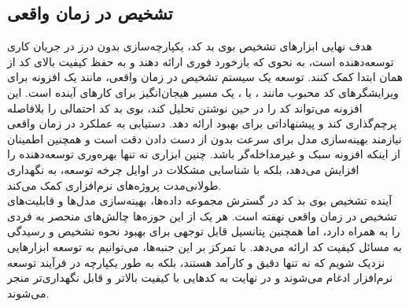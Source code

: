 \subsection{تشخیص در زمان واقعی}

هدف نهایی ابزارهای تشخیص بوی بد کد، یکپارچه‌سازی بدون درز در جریان کاری توسعه‌دهنده است، به نحوی که بازخورد فوری ارائه دهند و به حفظ کیفیت بالای کد از همان ابتدا کمک کنند. توسعه یک سیستم تشخیص در زمان واقعی، مانند یک افزونه برای ویرایشگرهای کد محبوب مانند ،  یا ، یک مسیر هیجان‌انگیز برای کارهای آینده است. این افزونه می‌تواند کد را در حین نوشتن تحلیل کند، بوی بد کد احتمالی را بلافاصله پرچم‌گذاری کند و پیشنهاداتی برای بهبود ارائه دهد. دستیابی به عملکرد در زمان واقعی نیازمند بهینه‌سازی مدل برای سرعت بدون از دست دادن دقت است و همچنین اطمینان از اینکه افزونه سبک و غیرمداخله‌گر باشد. چنین ابزاری نه تنها بهره‌وری توسعه‌دهنده را افزایش می‌دهد، بلکه با شناسایی مشکلات در اوایل چرخه توسعه، به نگهداری طولانی‌مدت پروژه‌های نرم‌افزاری کمک می‌کند.
\\
آینده تشخیص بوی بد کد در گسترش مجموعه داده‌ها، بهینه‌سازی مدل‌ها و قابلیت‌های تشخیص در زمان واقعی نهفته است. هر یک از این حوزه‌ها چالش‌های منحصر به فردی را به همراه دارد، اما همچنین پتانسیل قابل توجهی برای بهبود نحوه تشخیص و رسیدگی به مسائل کیفیت کد ارائه می‌دهد. با تمرکز بر این جنبه‌ها، می‌توانیم به توسعه ابزارهایی نزدیک شویم که نه تنها دقیق و کارآمد هستند، بلکه به طور یکپارچه در فرآیند توسعه نرم‌افزار ادغام می‌شوند و در نهایت به کدهایی با کیفیت بالاتر و قابل نگهداری‌تر منجر می‌شوند.
\clearpage
